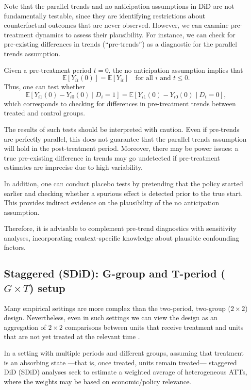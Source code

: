 Note that the parallel trends and no anticipation assumptions in DiD are not fundamentally testable, since they are identifying restrictions about counterfactual outcomes that are never observed. However, we can examine pre-treatment dynamics to assess their plausibility. For instance, we can check for pre-existing differences in trends (``pre-trends'') as a diagnostic for the parallel trends assumption.  

Given a pre-treatment period $t=0$, the no anticipation assumption implies that 
\[
\mathbb{E}[Y_{it}(0)] = \mathbb{E}[Y_{it}] \quad \text{for all } i \text{ and } t \leq 0.
\]
Thus, one can test whether
\begin{equation*}
	\mathbb{E}[Y_{i1}(0) - Y_{i0}(0) \mid D_i = 1] 
	= \mathbb{E}[Y_{i1}(0) - Y_{i0}(0) \mid D_i = 0],
\end{equation*}
which corresponds to checking for differences in pre-treatment trends between treated and control groups.

The results of such tests should be interpreted with caution. Even if pre-trends are perfectly parallel, this does not guarantee that the parallel trends assumption will hold in the post-treatment period. Moreover, there may be power issues: a true pre-existing difference in trends may go undetected if pre-treatment estimates are imprecise due to high variability.

In addition, one can conduct placebo tests by pretending that the policy started earlier and checking whether a spurious effect is detected prior to the true start. This provides indirect evidence on the plausibility of the no anticipation assumption.

Therefore, it is advisable to complement pre-trend diagnostics with sensitivity analyses, incorporating context-specific knowledge about plausible confounding factors.

\subsection{Staggered (SDiD): G-group and T-period ($G\times T$) setup}\label{chap12_52}

Many empirical settings are more complex than the two-period, two-group ($2\times 2$) design. Nevertheless, even in such settings we can view the design as an aggregation of $2\times 2$ comparisons between units that receive treatment and units that are not yet treated at the relevant time \cite{baker2025did_guide}.

In a setting with multiple periods and different groups, assuming that treatment is an absorbing state —that is, once treated, units remain treated— staggered DiD (SDiD) analyses seek to estimate a weighted average of heterogeneous ATTs, where the weights may be based on economic/policy relevance. 


